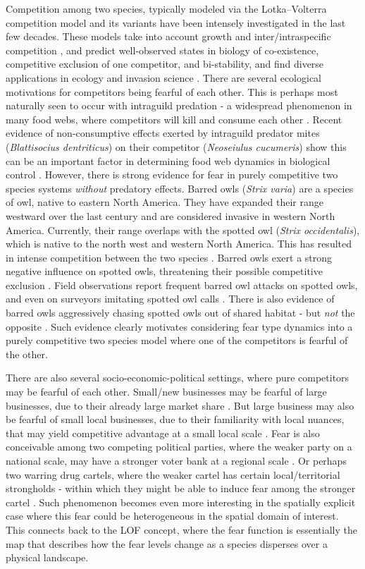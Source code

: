 \documentclass[10pt]{amsart}
\theoremstyle{definition}
\begin{document}
 
 Competition among two species, typically modeled via the Lotka–Volterra competition model and its variants have been intensely investigated in the last few decades. These models take into account growth and inter/intraspecific competition \cite{Lou2008}, and predict well-observed states in biology of co-existence, competitive exclusion of one competitor, and bi-stability, and find diverse applications in ecology and invasion science \cite{Boer86, Chess00, O89, S97, A06}.
 There are several ecological motivations for competitors being fearful of each other. This is perhaps most naturally seen to occur with intraguild predation - a widespread phenomenon in many food webs, where competitors will kill and consume each other \cite{Pol89}. Recent evidence of non-consumptive effects exerted by intraguild predator mites (\emph{Blattisocius dentriticus}) on their competitor (\emph{Neoseiulus cucumeris}) show this can be an important factor in determining food web dynamics in biological control \cite{Gu22, V96}. However, there is strong evidence for fear in purely competitive two species systems \emph{without} predatory effects. Barred owls (\emph{Strix varia}) are a species of owl, native to eastern North America. They have expanded their range westward over the last century and are considered invasive in western North America. Currently, their range overlaps with the spotted owl (\emph{Strix occidentalis}), which is native to the north west and western North America. This has resulted in intense competition between the two species \cite{Long19}. Barred owls exert a strong negative influence on spotted owls, threatening their possible competitive exclusion \cite{Van11}. Field observations report frequent barred owl attacks on spotted owls, and even on surveyors imitating spotted owl calls \cite{Gut04}. There is also evidence of barred owls aggressively chasing spotted owls out of shared habitat - but \emph{not} the opposite \cite{Wiens14}. Such evidence clearly motivates considering fear type dynamics into a purely competitive two species model where one of the competitors is fearful of the other. 


There are also several socio-economic-political settings, where pure competitors may be fearful of each other. Small/new businesses may be fearful of large businesses, due to their already large market share \cite{Byun20}. But large business may also be fearful of small local businesses, due to their familiarity with local nuances, that may yield competitive advantage at a small local scale \cite{Moen99}. Fear is also conceivable among two competing political parties, where the weaker party on a national scale, may have a stronger voter bank at a regional scale \cite{Lof16}. Or perhaps two warring drug cartels, where the weaker cartel has certain local/territorial strongholds \cite{Wain16, Sul02} - within which they might be able to induce fear among the stronger cartel \cite{Wain16}. Such phenomenon becomes even more interesting in the spatially explicit case where this fear could be heterogeneous in the spatial domain of interest. This connects back to the LOF concept, where the fear function is essentially the map that describes how the fear levels change as a species disperses over a physical landscape. 
 
\end{document}
